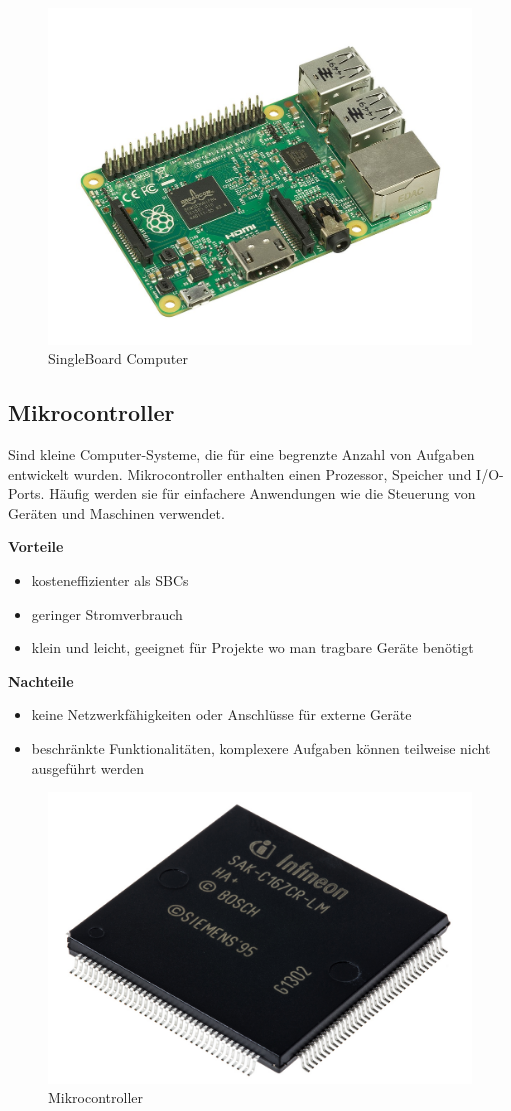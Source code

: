 \begin{figure}[H]
	\centering
	\includegraphics[width=0.7\linewidth]{images/SingleBoard Computer.jpg}
	\caption[SingleBoard Computer]{SingleBoard Computer}
	\label{fig:Single Board Computer}
\end{figure}

\subsection{Mikrocontroller}
Sind kleine Computer-Systeme, die für eine begrenzte Anzahl von Aufgaben entwickelt wurden. Mikrocontroller enthalten einen Prozessor, Speicher und I/O-Ports. Häufig werden sie für einfachere Anwendungen wie die Steuerung von Geräten und Maschinen verwendet. \textcite{EinzelplatinencomputerVsMikrocontroller}

\textbf{Vorteile}
\begin{itemize}
	\item kosteneffizienter als SBCs
	\item geringer Stromverbrauch
	\item klein und leicht, geeignet für Projekte wo man tragbare Geräte benötigt 
\end{itemize}

\textbf{Nachteile}
\begin{itemize}
	\item keine Netzwerkfähigkeiten oder Anschlüsse für externe Geräte
	\item beschränkte Funktionalitäten, komplexere Aufgaben können teilweise nicht ausgeführt werden
\end{itemize}

\begin{figure}[H]
	\centering
	\includegraphics[width=0.7\linewidth]{images/Mikrocontroller.jpg}
	\caption[Mikrocontroller]{Mikrocontroller}
	\label{fig:Mikrocontroller}
\end{figure}


